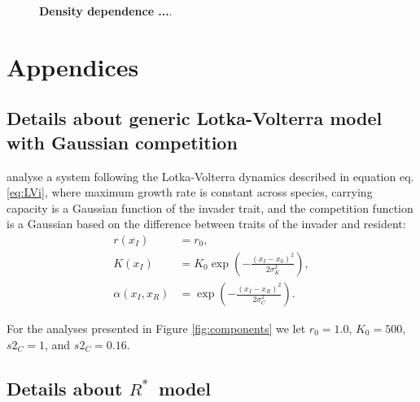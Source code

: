 \documentclass[a4paper,11pt]{article}
\newcommand{\Rstar}{\ensuremath{R^*}}
\begin{document}
\begin{figure}[h]
  \centering
  \caption{\textbf{Density dependence
  ...}.
  \label{fig:dd}}
\end{figure}


\clearpage




\section{Appendices}

\subsection{Details about generic Lotka-Volterra model with
Gaussian competition}\label{DD99}

\citet{Dieckmann-1999} analyse a system following the Lotka-Volterra dynamics
described in equation eq. \ref{eq:LVi}, where maximum growth rate is constant
across species, carrying capacity is a Gaussian
function of the invader trait, and the competition function is a Gaussian
based on the difference between traits of the invader and resident:
\begin{subequations}
\begin{align}
\label{eq:DD}
r(x_I) &= r_0, \\
K(x_I) &= K_0 \exp\left(-\frac{\left(x_I-x_0\right)^2}{2\sigma^2_K}\right),\\
\alpha(x_I, x_R) &= \exp\left(-\frac{\left(x_I-x_R\right)^2}{2\sigma^2_C}\right).
\end{align}
\end{subequations}

For the analyses presented in Figure \ref{fig:components} we let $r_0=1.0$, $K_0=500$,
 $s2_C=1$, and $s2_C=0.16$.

\subsection{Details about \Rstar\ model}\label{Rstar}
\end{document}
